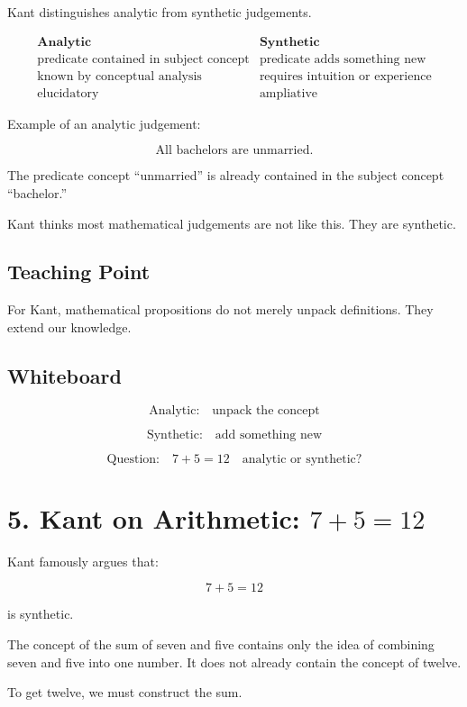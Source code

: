 \documentclass[11pt]{article}
\begin{document}
Kant distinguishes analytic from synthetic judgements.

\[
\begin{array}{c|c}
\textbf{Analytic} & \textbf{Synthetic} \\
\hline
\text{predicate contained in subject concept} &
\text{predicate adds something new} \\
\text{known by conceptual analysis} &
\text{requires intuition or experience} \\
\text{elucidatory} &
\text{ampliative}
\end{array}
\]

Example of an analytic judgement:

\[
\text{All bachelors are unmarried.}
\]

The predicate concept ``unmarried'' is already contained in the subject concept
``bachelor.''

Kant thinks most mathematical judgements are not like this. They are synthetic.

\subsection*{Teaching Point}

For Kant, mathematical propositions do not merely unpack definitions. They extend our
knowledge.

\subsection*{Whiteboard}

\[
\text{Analytic:}
\quad
\text{unpack the concept}
\]

\[
\text{Synthetic:}
\quad
\text{add something new}
\]

\[
\text{Question:}
\quad
7+5=12
\quad
\text{analytic or synthetic?}
\]

\section*{5. Kant on Arithmetic: \(7+5=12\)}

Kant famously argues that:

\[
7+5=12
\]

is synthetic.

The concept of the sum of seven and five contains only the idea of combining seven and
five into one number. It does not already contain the concept of twelve.

To get twelve, we must construct the sum.
\end{document}
